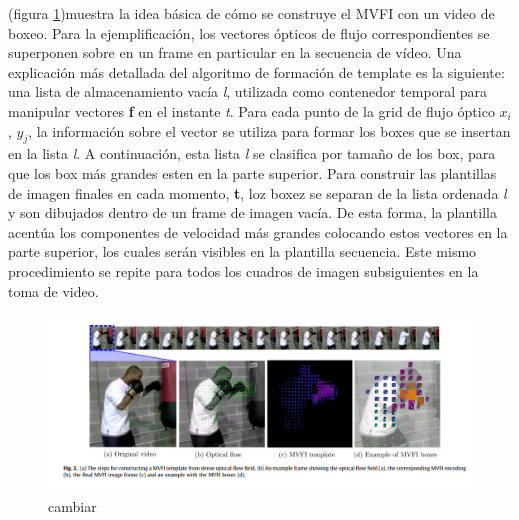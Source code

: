  
(figura \ref{fig:2})muestra la idea básica de cómo se construye el MVFI con un video de boxeo. Para la ejemplificación, los vectores ópticos de flujo correspondientes se superponen sobre en un frame en particular en la secuencia de vídeo. Una explicación más detallada del algoritmo de formación de template es la siguiente: una lista de almacenamiento vacía \textit{l}, utilizada como contenedor temporal para manipular vectores \textbf{f} en el instante \textit{t}. Para cada punto de la grid de flujo óptico $x_i$, $y_j$, la información sobre el vector se utiliza para formar los boxes que se insertan en la lista \textit{l}. A continuación, esta lista \textit{l} se clasifica por tamaño de los box, para que los box más grandes esten en la parte superior. Para construir las plantillas de imagen finales en cada momento, \textbf{t}, loz boxez se separan de la lista ordenada \textit{l} y son dibujados dentro de un frame de imagen vacía. De esta forma, la plantilla acentúa los componentes de velocidad más grandes colocando estos vectores en la parte superior, los cuales serán visibles en la plantilla secuencia. Este mismo procedimiento se repite para todos los cuadros de imagen subsiguientes en la toma de video.
 
 
\begin{figure}
\label{fig:2}
\includegraphics[width=1.0\linewidth]{Kap2/img/Selection_021.png}
\caption{cambiar}
\end{figure}



 

 


